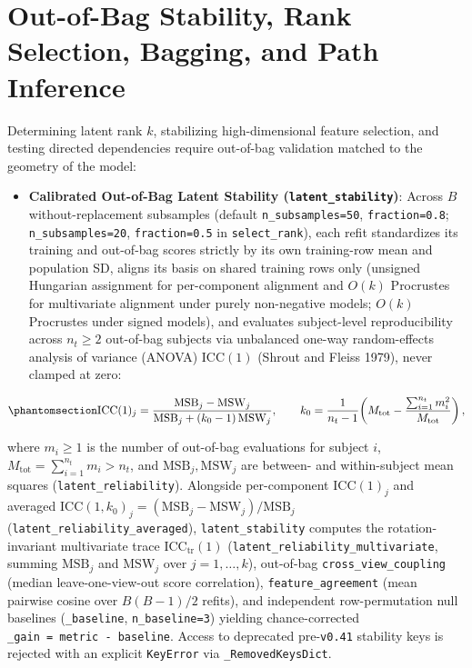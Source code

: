 \documentclass[
  10pt,
  letterpaper,
]{report}
\providecommand{\tightlist}{%
  \setlength{\itemsep}{0pt}\setlength{\parskip}{0pt}}
\begin{document}
\section{Out-of-Bag Stability, Rank Selection, Bagging, and Path
Inference}\label{sec-stability-bagging-sem}

Determining latent rank \(k\), stabilizing high-dimensional feature
selection, and testing directed dependencies require out-of-bag
validation matched to the geometry of the model:

\begin{itemize}
\tightlist
\item
  \textbf{Calibrated Out-of-Bag Latent Stability
  (\texttt{latent\_stability})}: Across \(B\) without-replacement
  subsamples (default \texttt{n\_subsamples=50}, \texttt{fraction=0.8};
  \texttt{n\_subsamples=20}, \texttt{fraction=0.5} in
  \texttt{select\_rank}), each refit standardizes its training and
  out-of-bag scores strictly by its own training-row mean and population
  SD, aligns its basis on shared training rows only (unsigned Hungarian
  assignment for per-component alignment and \(O(k)\) Procrustes for
  multivariate alignment under purely non-negative models; \(O(k)\)
  Procrustes under signed models), and evaluates subject-level
  reproducibility across \(n_t \ge 2\) out-of-bag subjects via
  unbalanced one-way random-effects analysis of variance (ANOVA)
  \(\mathrm{ICC}(1)\) (Shrout and Fleiss 1979), never clamped at zero:
\end{itemize}

\begin{equation}\protect\phantomsection\label{eq-oob-icc1}{
\mathrm{ICC}(1)_j = \frac{\mathrm{MSB}_j - \mathrm{MSW}_j}{\mathrm{MSB}_j + (k_0 - 1)\,\mathrm{MSW}_j}, \qquad k_0 = \frac{1}{n_t - 1}\!\left(M_{\text{tot}} - \frac{\sum_{i=1}^{n_t} m_i^2}{M_{\text{tot}}}\right),
}\end{equation}

where \(m_i \ge 1\) is the number of out-of-bag evaluations for subject
\(i\), \(M_{\text{tot}} = \sum_{i=1}^{n_t} m_i > n_t\), and
\(\mathrm{MSB}_j, \mathrm{MSW}_j\) are between- and within-subject mean
squares (\texttt{latent\_reliability}). Alongside per-component
\(\mathrm{ICC}(1)_j\) and averaged
\(\mathrm{ICC}(1, k_0)_j = (\mathrm{MSB}_j - \mathrm{MSW}_j)/\mathrm{MSB}_j\)
(\texttt{latent\_reliability\_averaged}), \texttt{latent\_stability}
computes the rotation-invariant multivariate trace
\(\mathrm{ICC}_{\text{tr}}(1)\)
(\texttt{latent\_reliability\_multivariate}, summing \(\mathrm{MSB}_j\)
and \(\mathrm{MSW}_j\) over \(j = 1, \dots, k\)), out-of-bag
\texttt{cross\_view\_coupling} (median leave-one-view-out score
correlation), \texttt{feature\_agreement} (mean pairwise cosine over
\(B(B-1)/2\) refits), and independent row-permutation null baselines
(\texttt{\_baseline}, \texttt{n\_baseline=3}) yielding chance-corrected
\texttt{\_gain\ =\ metric\ -\ baseline}. Access to deprecated
pre-\texttt{v0.41} stability keys is rejected with an explicit
\texttt{KeyError} via \texttt{\_RemovedKeysDict}.
\end{document}
